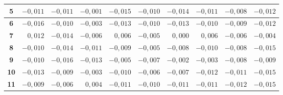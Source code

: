 \begin{table} [htbp]
{\begin{tabular}{|c|rrr|rrr|rrr|}
			\textbf{5}                  & 
			\multicolumn{1}{r|}{$-0,011$}       & \multicolumn{1}{r|}{$-0,011$}       & $-0,001$                            & \multicolumn{1}{r|}{$-0,015$}       & \multicolumn{1}{r|}{$-0,010$}       & $-0,014$                            & \multicolumn{1}{r|}{$-0,011$}       & \multicolumn{1}{r|}{$-0,008$}       & $-0,012$                            \\ \hline
			\textbf{6}                  & 
			\multicolumn{1}{r|}{$-0,016$}       & \multicolumn{1}{r|}{$-0,010$}       & $-0,003$                            & \multicolumn{1}{r|}{$-0,013$}       & \multicolumn{1}{r|}{$-0,010$}       & $-0,013$                            & \multicolumn{1}{r|}{$-0,010$}       & \multicolumn{1}{r|}{$-0,009$}       & $-0,012$                            \\ \hline
			\textbf{7}                  & 
			\multicolumn{1}{r|}{$ 0,012$}       & \multicolumn{1}{r|}{$-0,014$}       & $-0,006$                            & \multicolumn{1}{r|}{$ 0,006$}       & \multicolumn{1}{r|}{$-0,005$}       & $ 0,000$                            & \multicolumn{1}{r|}{$ 0,006$}       & \multicolumn{1}{r|}{$-0,006$}       & $-0,004$                            \\ \hline
			\textbf{8}                  & 
			\multicolumn{1}{r|}{$-0,010$}       & \multicolumn{1}{r|}{$-0,014$}       & $-0,011$                            & \multicolumn{1}{r|}{$-0,009$}       & \multicolumn{1}{r|}{$-0,005$}       & $-0,008$                            & \multicolumn{1}{r|}{$-0,010$}       & \multicolumn{1}{r|}{$-0,008$}       & $-0,015$                            \\ \hline
			\textbf{9}                  & 
			\multicolumn{1}{r|}{$-0,010$}       & \multicolumn{1}{r|}{$-0,016$}       & $-0,013$                            & \multicolumn{1}{r|}{$-0,005$}       & \multicolumn{1}{r|}{$-0,007$}       & $-0,002$                            & \multicolumn{1}{r|}{$-0,003$}       & \multicolumn{1}{r|}{$-0,008$}       & $-0,009$                            \\ \hline
			\textbf{10}                 & 
			\multicolumn{1}{r|}{$-0,013$}       & \multicolumn{1}{r|}{$-0,009$}       & $-0,003$                            & \multicolumn{1}{r|}{$-0,010$}       & \multicolumn{1}{r|}{$-0,006$}       & $-0,007$                            & \multicolumn{1}{r|}{$-0,012$}       & \multicolumn{1}{r|}{$-0,011$}       & $-0,015$                            \\ \hline
			\textbf{11}                 & 
			\multicolumn{1}{r|}{$-0,009$}       & \multicolumn{1}{r|}{$-0,006$}       & $ 0,004$                            & \multicolumn{1}{r|}{$-0,011$}       & \multicolumn{1}{r|}{$-0,010$}       & $-0,011$                            & \multicolumn{1}{r|}{$-0,011$}       & \multicolumn{1}{r|}{$-0,012$}       & $-0,015$                            \\ \hline

\end{tabular}}
\end{table}
